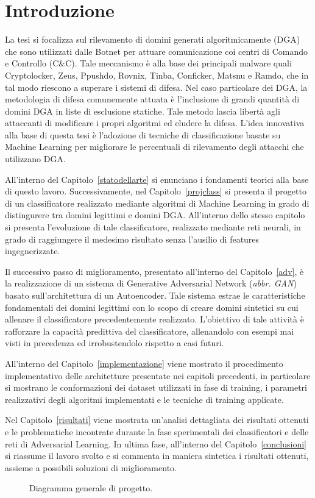 \chapter{Introduzione}

La tesi si focalizza sul rilevamento di domini generati algoritmicamente (DGA) che sono utilizzati dalle Botnet per attuare comunicazione coi centri di Comando e Controllo (C\&C). Tale meccanismo è alla base dei principali malware quali Cryptolocker, Zeus, Ppushdo, Rovnix, Tinba, Conficker, Matsnu e Ramdo, che in tal modo riescono a superare i sistemi di difesa. Nel caso particolare dei DGA, la metodologia di difesa comunemente attuata è l'inclusione di grandi quantità di domini DGA in liste di esclusione statiche. Tale metodo lascia libertà agli attaccanti di modificare i propri algoritmi ed eludere la difesa. L'idea innovativa alla base di questa tesi è l'adozione di tecniche di classificazione basate su Machine Learning per migliorare le percentuali di rilevamento degli attacchi che utilizzano DGA.

All'interno del Capitolo~\ref{statodellarte} si enunciano i fondamenti teorici alla base di questo lavoro. Successivamente, nel Capitolo~\ref{projclass} si presenta il progetto di un classificatore realizzato mediante algoritmi di Machine Learning in grado di distingurere tra domini legittimi e domini DGA. All'interno dello stesso capitolo si presenta l'evoluzione di tale classificatore, realizzato mediante reti neurali, in grado di raggiungere il medesimo risultato senza l'ausilio di features ingegnerizzate.

Il successivo passo di miglioramento, presentato all'interno del Capitolo~\ref{adv}, è la realizzazione di un sistema di Generative Adversarial Network (\textit{abbr. GAN}) basato sull'architettura di un Autoencoder. Tale sistema estrae le caratteristiche fondamentali dei domini legittimi con lo scopo di creare domini sintetici su cui allenare il classificatore precedentemente realizzato. L'obiettivo di tale attività è rafforzare la capacità predittiva del classificatore, allenandolo con esempi mai visti in precedenza ed irrobustendolo rispetto a casi futuri.
 
All'interno del Capitolo~\ref{implementazione} viene mostrato il procedimento implementativo delle architetture presentate nei capitoli precedenti, in particolare si mostrano le conformazioni dei dataset utilizzati in fase di training, i parametri realizzativi degli algoritmi implementati e le tecniche di training applicate.

Nel Capitolo~\ref{risultati} viene mostrata un'analisi dettagliata dei risultati ottenuti e le problematiche incontrate durante la fase sperimentali dei classificatori e delle reti di Adversarial Learning. In ultima fase, all'interno del Capitolo~\ref{conclusioni} si riassume il lavoro svolto e si commenta in maniera sintetica i risultati ottenuti, assieme a possibili soluzioni di miglioramento.

\begin{figure}[!bp]
    \centering
	
	\caption{Diagramma generale di progetto. \label{fig:intro}}
\end{figure}
